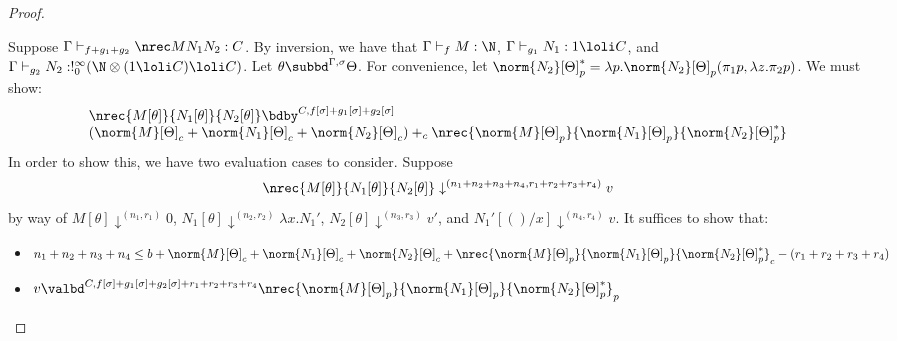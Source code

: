 \begin{proof}
\begin{itemize}
Suppose $\Gamma \vdash_{f+g_1+g_2} \nrec M {N_1} {N_2} : C$. 
By inversion, we have that $\Gamma \vdash_f M : \N$, $\Gamma \vdash_{g_1} N_1 : 1 \loli C$, and $\Gamma \vdash_{g_2} N_2 : !^\infty_0 (\N \otimes (1 \loli C) \loli C)$. 
Let $\theta \subbd^{\Gamma,\sigma} \Theta$. For convenience, let $\norm{N_2}[\Theta]_p^* = \lambda p.\norm{N_2}[\Theta]_p(\pi_1 p,\lambda z. \pi_2 p)$.
We must show: 
$$
\begin{array}{l}
\nrec {M[\theta]} {N_1[\theta]} {N_2[\theta]} \bdby^{C,f[\sigma] + g_1[\sigma] + g_2[\sigma]}\\
(\norm{M}[\Theta]_c + \norm{N_1}[\Theta]_c + \norm{N_2}[\Theta]_c) +_c \nrec {\norm{M}[\Theta]_p} {\norm{N_1}[\Theta]_p} {\norm{N_2} [\Theta]_p^*}
\end{array}
$$
In order to show this, we have two evaluation cases to consider.
Suppose 
$$\nrec {M[\theta]} {N_1[\theta]} {N_2[\theta]} \downarrow^{(n_1+n_2+n_3+n_4,r_1+r_2+r_3+r_4)} v$$
by way of $M[\theta] \downarrow^{(n_1,r_1)} 0$, $N_1[\theta] \downarrow^{(n_2,r_2)} \lambda x.N_1'$, $N_2[\theta] \downarrow^{(n_3,r_3)} v'$, and $N_1'[()/x] \downarrow^{(n_4,r_4)} v$. 
It suffices to show that:
\begin{itemize}
  \item $n_1+n_2+n_3+n_4 \leq b + \norm{M}[\Theta]_c + \norm{N_1}[\Theta]_c + \norm{N_2}[\Theta]_c + \nrec {\norm{M}[\Theta]_p} {\norm{N_1}[\Theta]_p} {\norm{N_2} [\Theta]_p^*}_c - (r_1 + r_2 + r_3 + r_4)$
  \item $v \valbd^{C,f[\sigma] + g_1[\sigma] + g_2[\sigma] + r_1 + r_2 + r_3 + r_4} \nrec {\norm{M}[\Theta]_p} {\norm{N_1}[\Theta]_p} {\norm{N_2} [\Theta]_p^*}_p$
\end{itemize}


\end{itemize}
\end{proof}

